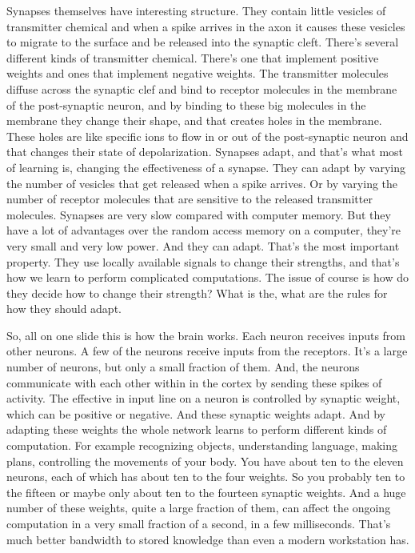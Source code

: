 \begin{multicols}{2}
\begin{footnotesize}
Synapses themselves have interesting structure. They contain little vesicles of transmitter chemical and when a spike arrives in the axon it causes these vesicles to migrate to the surface and be released into the synaptic cleft. There's several different kinds of transmitter chemical. There's one that implement positive weights and ones that implement negative weights. The transmitter molecules diffuse across the synaptic clef and bind to receptor molecules in the membrane of the post-synaptic neuron, and by binding to these big molecules in the membrane they change their shape, and that creates holes in the membrane. These holes are like specific ions to flow in or out of the post-synaptic neuron and that changes their state of depolarization. Synapses adapt, and that's what most of learning is, changing the effectiveness of a synapse. They can adapt by varying the number of vesicles that get released when a spike arrives. Or by varying the number of receptor molecules that are sensitive to the released transmitter molecules. Synapses are very slow compared with computer memory. But they have a lot of advantages over the random access memory on a computer, they're very small and very low power. And they can adapt. That's the most important property. They use locally available signals to change their strengths, and that's how we learn to perform complicated computations. The issue of course is how do they decide how to change their strength? What is the, what are the rules for how they should adapt.

So, all on one slide this is how the brain works. Each neuron receives inputs from other neurons. A few of the neurons receive inputs from the receptors. It's a large number of neurons, but only a small fraction of them. And, the neurons communicate with each other within in the cortex by sending these spikes of activity. The effective in input line on a neuron is controlled by synaptic weight, which can be positive or negative. And these synaptic weights adapt. And by adapting these weights the whole network learns to perform different kinds of computation. For example recognizing objects, understanding language, making plans, controlling the movements of your body. You have about ten to the eleven neurons, each of which has about ten to the four weights. So you probably ten to the fifteen or maybe only about ten to the fourteen synaptic weights. And a huge number of these weights, quite a large fraction of them, can affect the ongoing computation in a very small fraction of a second, in a few milliseconds. That's much better bandwidth to stored knowledge than even a modern workstation has.


\end{footnotesize}
\end{multicols}

